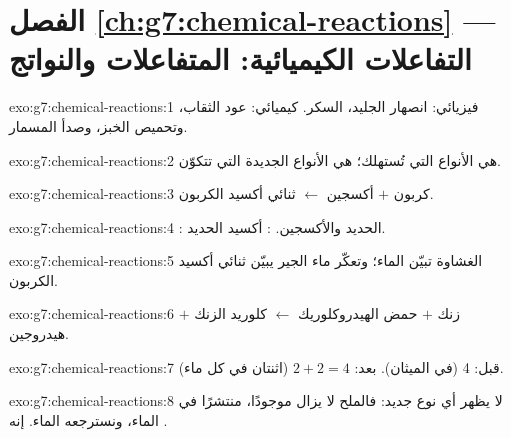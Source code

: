 \section*{الفصل \ref{ch:g7:chemical-reactions} --- التفاعلات الكيميائية: المتفاعلات والنواتج}

\begin{solution}{exo:g7:chemical-reactions:1}
فيزيائي: انصهار الجليد،  السكر. كيميائي:  عود الثقاب،
وتحميص الخبز، وصدأ المسمار.
\end{solution}

\begin{solution}{exo:g7:chemical-reactions:2}
 هي الأنواع التي تُستهلك؛  هي الأنواع الجديدة التي
تتكوّن.
\end{solution}

\begin{solution}{exo:g7:chemical-reactions:3}
كربون $+$ أكسجين $\longleftarrow$ ثنائي أكسيد الكربون.
\end{solution}

\begin{solution}{exo:g7:chemical-reactions:4}
: الحديد والأكسجين. : أكسيد الحديد.
\end{solution}

\begin{solution}{exo:g7:chemical-reactions:5}
الغشاوة تبيّن الماء؛ وتعكّر ماء الجير يبيّن ثنائي أكسيد الكربون.
\end{solution}

\begin{solution}{exo:g7:chemical-reactions:6}
زنك $+$ حمض الهيدروكلوريك $\longleftarrow$ كلوريد الزنك $+$ هيدروجين.
\end{solution}

\begin{solution}{exo:g7:chemical-reactions:7}
قبل: 4 (في  الميثان). بعد: $2 + 2 = 4$ (اثنتان في كل 
ماء).
\end{solution}

\begin{solution}{exo:g7:chemical-reactions:8}
لا يظهر أي نوع جديد: فالملح لا يزال موجودًا، منتشرًا في الماء، ونسترجعه
 الماء. إنه .
\end{solution}

